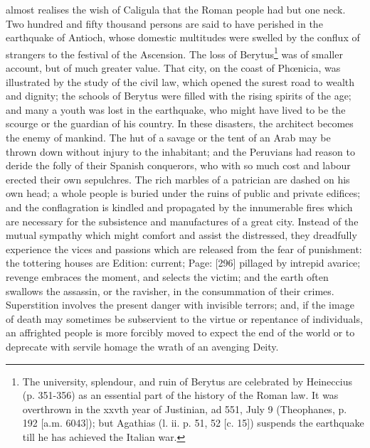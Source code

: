 almost realises the wish of Caligula that the Roman people had but one neck. Two hundred and fifty thousand persons are said to have perished in the earthquake of Antioch, whose domestic multitudes were swelled by the conflux of strangers to the festival of the Ascension. The loss of Berytus\footnote{The university, splendour, and ruin of Berytus are celebrated by Heineccius (p. 351-356) as an essential part of the history of the Roman law. It was overthrown in the xxvth year of Justinian, ad 551, July 9 (Theophanes, p. 192 [a.m. 6043]); but Agathias (l. ii. p. 51, 52 [c. 15]) suspends the earthquake till he has achieved the Italian war.} was of smaller account, but of much greater value. That city, on the coast of Phœnicia, was illustrated by the study of the civil law, which opened the surest road to wealth and dignity; the schools of Berytus were filled with the rising spirits of the age; and many a youth was lost in the earthquake, who might have lived to be the scourge or the guardian of his country. In these disasters, the architect becomes the enemy of mankind. The hut of a savage or the tent of an Arab may be thrown down without injury to the inhabitant; and the Peruvians had reason to deride the folly of their Spanish conquerors, who with so much cost and labour erected their own sepulchres. The rich marbles of a patrician are dashed on his own head; a whole people is buried under the ruins of public and private edifices; and the conflagration is kindled and propagated by the innumerable fires which are necessary for the subsistence and manufactures of a great city. Instead of the mutual sympathy which might comfort and assist the distressed, they dreadfully experience the vices and passions which are released from the fear of punishment: the tottering houses are Edition: current; Page: [296] pillaged by intrepid avarice; revenge embraces the moment, and selects the victim; and the earth often swallows the assassin, or the ravisher, in the consummation of their crimes. Superstition involves the present danger with invisible terrors; and, if the image of death may sometimes be subservient to the virtue or repentance of individuals, an affrighted people is more forcibly moved to expect the end of the world or to deprecate with servile homage the wrath of an avenging Deity.

